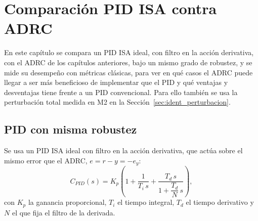 \chapter{Comparación PID ISA contra ADRC}
\label{cap:comparacion_pid}
En este capítulo se compara un PID ISA ideal, con filtro en la acción derivativa, con el ADRC de los
capítulos anteriores, bajo un mismo grado de robustez, y se mide su desempeño con métricas clásicas,
para ver en qué casos el ADRC puede llegar a ser más beneficioso de implementar que el PID y qué
ventajas y desventajas tiene frente a un PID convencional. Para ello también se usa la perturbación
total medida en M2 en la Sección~\ref{sec:ident_perturbacion}.
\section{PID con misma robustez}
\label{sec:pid_robustez}

Se usa un PID ISA ideal con filtro en la acción derivativa, que actúa sobre el mismo error que el ADRC,
$e = r - y = -e_y$:
\begin{equation}
C_{PID}(s) = K_p\left(1 + \frac{1}{T_i\,s} + \frac{T_d\,s}{1 + \dfrac{T_d}{N}\,s}\right),
\label{eq:pid_isa}
\end{equation}
con $K_p$ la ganancia proporcional, $T_i$ el tiempo integral, $T_d$ el tiempo
derivativo y $N$ el que fija el filtro de la derivada.

